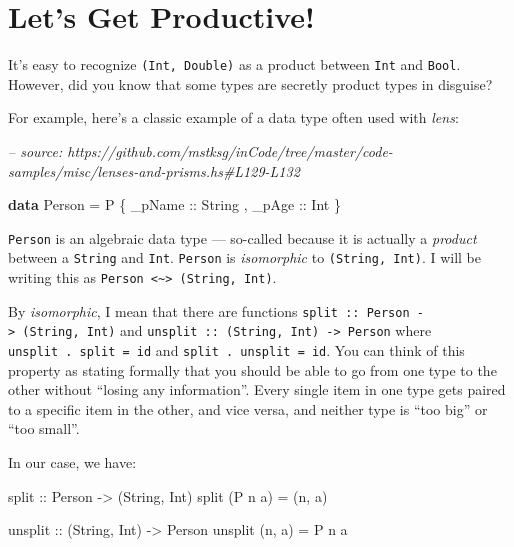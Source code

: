 \documentclass[]{article}
\newenvironment{Shaded}{}{}
\newcommand{\CommentTok}[1]{\textcolor[rgb]{0.38,0.63,0.69}{\textit{#1}}}
\newcommand{\DataTypeTok}[1]{\textcolor[rgb]{0.56,0.13,0.00}{#1}}
\newcommand{\FunctionTok}[1]{\textcolor[rgb]{0.02,0.16,0.49}{#1}}
\newcommand{\KeywordTok}[1]{\textcolor[rgb]{0.00,0.44,0.13}{\textbf{#1}}}
\newcommand{\NormalTok}[1]{#1}
\newcommand{\OtherTok}[1]{\textcolor[rgb]{0.00,0.44,0.13}{#1}}
\begin{document}
\hypertarget{lets-get-productive}{%
\section{Let's Get Productive!}\label{lets-get-productive}}

It's easy to recognize \texttt{(Int,\ Double)} as a product between \texttt{Int}
and \texttt{Bool}. However, did you know that some types are secretly product
types in disguise?

For example, here's a classic example of a data type often used with
\emph{lens}:

\begin{Shaded}
\begin{Highlighting}[]
\CommentTok{-- source: https://github.com/mstksg/inCode/tree/master/code-samples/misc/lenses-and-prisms.hs#L129-L132}

\KeywordTok{data} \DataTypeTok{Person} \FunctionTok{=} \DataTypeTok{P}
\NormalTok{    \{}\OtherTok{ _pName ::} \DataTypeTok{String}
\NormalTok{    ,}\OtherTok{ _pAge  ::} \DataTypeTok{Int}
\NormalTok{    \}}
\end{Highlighting}
\end{Shaded}

\texttt{Person} is an algebraic data type --- so-called because it is actually a
\emph{product} between a \texttt{String} and \texttt{Int}. \texttt{Person} is
\emph{isomorphic} to \texttt{(String,\ Int)}. I will be writing this as
\texttt{Person\ \textless{}\textasciitilde{}\textgreater{}\ (String,\ Int)}.

By \emph{isomorphic}, I mean that there are functions
\texttt{split\ ::\ Person\ -\textgreater{}\ (String,\ Int)} and
\texttt{unsplit\ ::\ (String,\ Int)\ -\textgreater{}\ Person} where
\texttt{unsplit\ .\ split\ =\ id} and \texttt{split\ .\ unsplit\ =\ id}. You can
think of this property as stating formally that you should be able to go from
one type to the other without ``losing any information''. Every single item in
one type gets paired to a specific item in the other, and vice versa, and
neither type is ``too big'' or ``too small''.

In our case, we have:

\begin{Shaded}
\begin{Highlighting}[]
\OtherTok{split ::} \DataTypeTok{Person} \OtherTok{->}\NormalTok{ (}\DataTypeTok{String}\NormalTok{, }\DataTypeTok{Int}\NormalTok{)}
\NormalTok{split (}\DataTypeTok{P}\NormalTok{ n a) }\FunctionTok{=}\NormalTok{ (n, a)}

\OtherTok{unsplit ::}\NormalTok{ (}\DataTypeTok{String}\NormalTok{, }\DataTypeTok{Int}\NormalTok{) }\OtherTok{->} \DataTypeTok{Person}
\NormalTok{unsplit (n, a) }\FunctionTok{=} \DataTypeTok{P}\NormalTok{ n a}
\end{Highlighting}
\end{Shaded}
\end{document}
